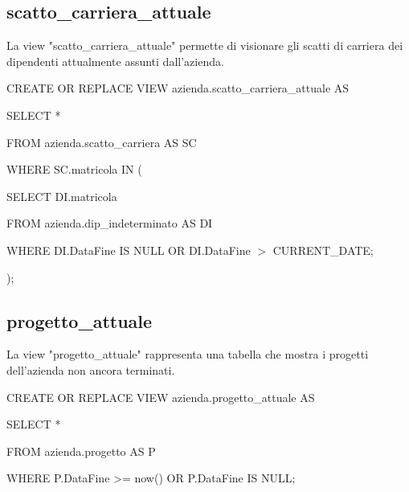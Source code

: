         \subsection{scatto\_carriera\_attuale}
        La view "scatto\_carriera\_attuale" permette di visionare gli scatti di carriera dei dipendenti attualmente assunti dall'azienda.
            \ttfamily
                \begin{flushleft}
                    \begin{description}
                        \item CREATE OR REPLACE VIEW azienda.scatto\_carriera\_attuale AS
                        \item SELECT *      
                        \item FROM azienda.scatto\_carriera AS SC
                        \item WHERE SC.matricola IN (
                        \begin{description}
                            \item SELECT DI.matricola
                            \item FROM azienda.dip\_indeterminato AS DI
                            \item WHERE DI.DataFine IS NULL OR DI.DataFine \(>\) CURRENT\_DATE;
                        \end{description}
                        );
                    \end{description}
                \end{flushleft}
            \normalfont

        \subsection{progetto\_attuale}
        La view "progetto\_attuale" rappresenta una tabella che mostra i progetti dell'azienda non ancora terminati. 
            \ttfamily
                \begin{flushleft}
                    \begin{description}
                        \item CREATE OR REPLACE VIEW azienda.progetto\_attuale AS
                        \item SELECT *       
                        \item FROM azienda.progetto AS P
                        \item WHERE P.DataFine >= now() OR P.DataFine IS NULL;
                    \end{description}
                \end{flushleft}
            \normalfont

